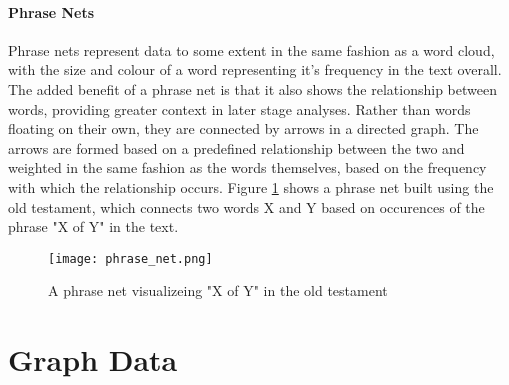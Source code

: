\paragraph{Phrase Nets}
Phrase nets \cite{VanHam2009} represent data to some extent in the same fashion as a word cloud, with the size and colour of a word representing it's frequency in the text overall. The added benefit of a phrase net is that it also shows the relationship between words, providing greater context in later stage analyses. Rather than words floating on their own, they are connected by arrows in a directed graph. The arrows are formed based on a predefined relationship between the two and weighted in the same fashion as the words themselves, based on the frequency with which the relationship occurs. Figure \ref{fig:phrasenet} shows a phrase net built using the old testament, which connects two words X and Y based on occurences of the phrase "X of Y" in the text.

\begin{figure}
	\centering
	\label{fig:phrasenet}
	\texttt{[image: phrase\_net.png]}
	\caption{A phrase net visualizeing "X of Y" in the old testament \cite{VanHam1987}}
\end{figure}




\section{Graph Data}
\label{sec:graph_data}


